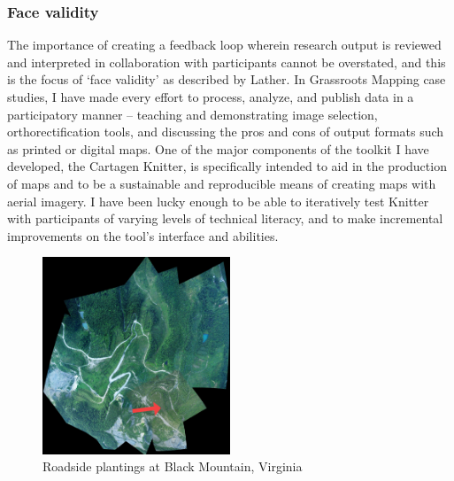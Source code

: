 \documentclass[11pt]{report}
\begin{document}
\subsubsection{Face validity}

The importance of creating a feedback loop wherein research output is reviewed and interpreted in collaboration with participants cannot be overstated, and this is the focus of `face validity' as described by Lather. In Grassroots Mapping case studies, I have made every effort to process, analyze, and publish data in a participatory manner -- teaching and demonstrating image selection, orthorectification tools, and discussing the pros and cons of output formats such as printed or digital maps. One of the major components of the toolkit I have developed, the Cartagen Knitter, is specifically intended to aid in the production of maps and to be a sustainable and reproducible means of creating maps with aerial imagery. I have been lucky enough to be able to iteratively test Knitter with participants of varying levels of technical literacy, and to make incremental improvements on the tool's interface and abilities.  

\begin{figure}
  \begin{flushright}
	\includegraphics[width=0.5\textwidth]{images/black-mountain.jpg}
	\caption{Roadside plantings at Black Mountain, Virginia}
  \end{flushright}
\end{figure}
\end{document}
